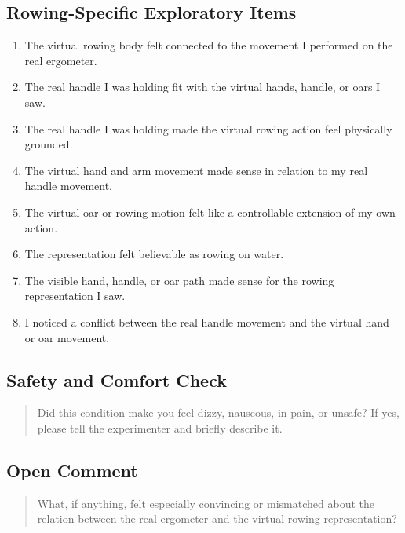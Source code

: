 \subsection*{Rowing-Specific Exploratory Items}

\begin{enumerate}
    \item The virtual rowing body felt connected to the movement I performed on the real ergometer.
    \item The real handle I was holding fit with the virtual hands, handle, or oars I saw.
    \item The real handle I was holding made the virtual rowing action feel physically grounded.
    \item The virtual hand and arm movement made sense in relation to my real handle movement.
    \item The virtual oar or rowing motion felt like a controllable extension of my own action.
    \item The representation felt believable as rowing on water.
    \item The visible hand, handle, or oar path made sense for the rowing representation I saw.
    \item I noticed a conflict between the real handle movement and the virtual hand or oar movement.
\end{enumerate}

\subsection*{Safety and Comfort Check}

\begin{quote}
Did this condition make you feel dizzy, nauseous, in pain, or unsafe? If yes, please tell the experimenter and briefly describe it.
\end{quote}

\subsection*{Open Comment}

\begin{quote}
What, if anything, felt especially convincing or mismatched about the relation between the real ergometer and the virtual rowing representation?
\end{quote}
